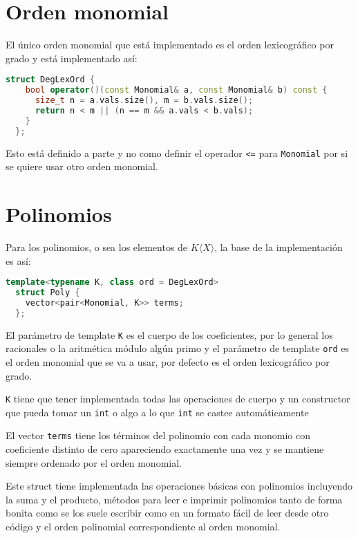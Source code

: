 \documentclass{amsbook} %
\theoremstyle{customstyle}
\theoremstyle{factstyle}
\begin{document}
\section{Orden monomial}

El único orden monomial que está implementado es el orden lexicográfico por grado y está implementado así:

\begin{lstlisting}[language=C++]
  struct DegLexOrd {
    bool operator()(const Monomial& a, const Monomial& b) const {
      size_t n = a.vals.size(), m = b.vals.size();
      return n < m || (n == m && a.vals < b.vals);
    }
  };
\end{lstlisting}

Esto está definido a parte y no como definir el operador \texttt{<=} para \texttt{Monomial} por si se quiere usar otro orden monomial.

\section{Polinomios}

Para los polinomios, o sea los elementos de $K⟨X⟩$, la base de la implementación es así:

\begin{lstlisting}[language=C++]
  template<typename K, class ord = DegLexOrd>
  struct Poly {
    vector<pair<Monomial, K>> terms;
  };
\end{lstlisting}

El parámetro de template \texttt{K} es el cuerpo de los coeficientes, por lo general los racionales o la aritmética módulo algún primo y el parámetro de template \texttt{ord} es el orden monomial que se va a usar, por defecto es el orden lexicográfico por grado.

\texttt{K} tiene que tener implementada todas las operaciones de cuerpo y un constructor que pueda tomar un \texttt{int} o algo a lo que \texttt{int} se castee automáticamente

El vector \texttt{terms} tiene los términos del polinomio con cada monomio con coeficiente distinto de cero apareciendo exactamente una vez y se mantiene siempre ordenado por el orden monomial.

Este struct tiene implementada las operaciones básicas con polinomios incluyendo la suma y el producto, métodos para leer e imprimir polinomios tanto de forma bonita como se los suele escribir como en un formato fácil de leer desde otro código y el orden polinomial correspondiente al orden monomial.
\end{document}
